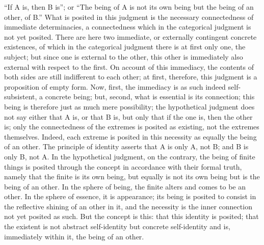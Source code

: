 “If A is, then B is”;
or “The being of A is not its own being
but the being of an other, of B.”
What is posited in this judgment is
the necessary connectedness of immediate determinacies,
a connectedness which in the categorical judgment
is not yet posited.
There are here two immediate,
or externally contingent concrete existences,
of which in the categorical judgment
there is at first only one, the subject;
but since one is external to the other,
this other is immediately also external
with respect to the first.
On account of this immediacy,
the contents of both sides are still
indifferent to each other;
at first, therefore, this judgment is
a proposition of empty form.
Now, first, the immediacy is as such
indeed self-subsistent, a concrete being;
but, second, what is essential is its connection;
this being is therefore just as much mere possibility;
the hypothetical judgment does not say
either that A is, or that B is,
but only that if the one is, then the other is;
only the connectedness of the extremes is
posited as existing, not the extremes themselves.
Indeed, each extreme is posited in this necessity
as equally the being of an other.
The principle of identity asserts that
A is only A, not B;
and B is only B, not A.
In the hypothetical judgment, on the contrary,
the being of finite things is posited through the concept
in accordance with their formal truth,
namely that the finite is its own being,
but equally is not its own being
but is the being of an other.
In the sphere of being,
the finite alters and comes to be an other.
In the sphere of essence,
it is appearance;
its being is posited to consist in
the reflective shining of an other in it,
and the necessity is the inner connection
not yet posited as such.
But the concept is this:
that this identity is posited;
that the existent is not abstract self-identity
but concrete self-identity
and is, immediately within it,
the being of an other.

